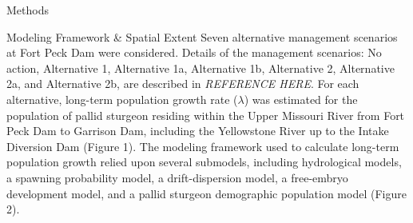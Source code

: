 \documentclass[12pt]{article}
\begin{document}
\begin{section}{Methods}
\begin{subsection}{Modeling Framework \& Spatial Extent}
Seven alternative management scenarios at Fort Peck Dam were considered.   Details of the management scenarios:  No action, Alternative 1, Alternative 1a, Alternative 1b, Alternative 2, Alternative 2a, and Alternative 2b, are described in \textit{REFERENCE HERE}.  For each alternative, long-term population growth rate ($\lambda$) was estimated for the population of pallid sturgeon residing within the Upper Missouri River from Fort Peck Dam to Garrison Dam, including the Yellowstone River up to the Intake Diversion Dam (Figure 1).  The modeling framework used to calculate long-term population growth relied upon several submodels, including hydrological models, a spawning probability model, a drift-dispersion model, a free-embryo development model, and a pallid sturgeon demographic population model (Figure 2).  


\end{subsection}
\end{section}
\end{document}
